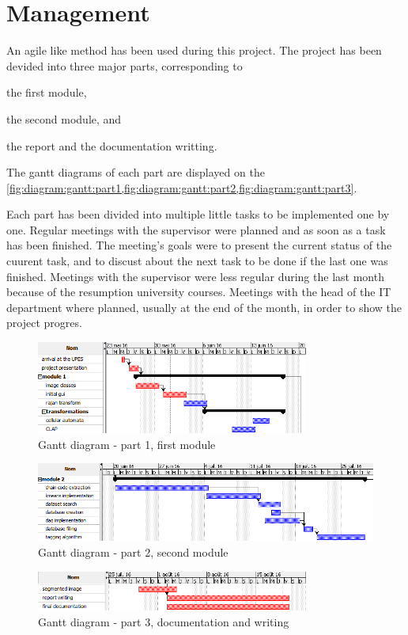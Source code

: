 \chapter{Management}



An agile like method has been used during this project. The project has been devided into three major parts, corresponding to 
\begin{inparaenum}[1)] 
	\item the first module, 
	\item the second module, and 
	\item the report and the documentation writting. 
\end{inparaenum} 
The gantt diagrams of each part are displayed on the \vref{fig:diagram:gantt:part1,fig:diagram:gantt:part2,fig:diagram:gantt:part3}. 

Each part has been divided into multiple little tasks to be implemented one by one. Regular meetings with the supervisor were planned and as soon as a task has been finished. The meeting's goals were to present the current status of the cuurent task, and to discust about the next task to be done if the last one was finished. Meetings with the supervisor were less regular during the last month because of the resumption university courses. Meetings with the head of the \gls{IT} department where planned, usually at the end of the month, in order to show the project progres. 


\begin{figure}[H]
	\centering
	\includegraphics[width=0.8\textwidth]{images/gantt/gantt_part_1}
	\caption{Gantt diagram - part 1, first module}
	\label{fig:diagram:gantt:part1}
\end{figure}


\begin{figure}[H]
	\centering
	\includegraphics[width=1\textwidth]{images/gantt/gantt_part_2}
	\caption{Gantt diagram - part 2, second module}
	\label{fig:diagram:gantt:part2}
\end{figure}


\begin{figure}[H]
	\centering
	\includegraphics[width=0.8\textwidth]{images/gantt/gantt_part_3}
	\caption{Gantt diagram - part 3, documentation and writing}
	\label{fig:diagram:gantt:part3}
\end{figure}
	




